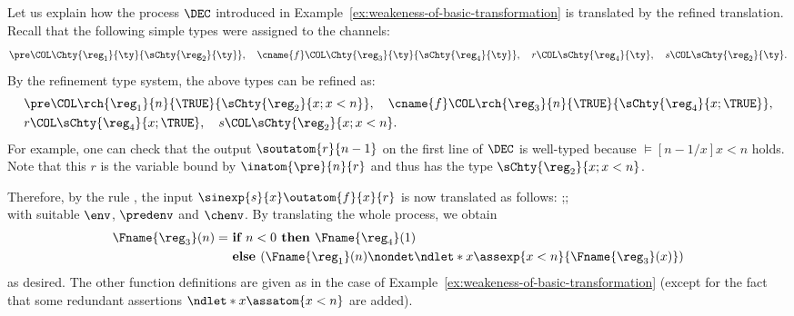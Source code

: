 \begin{example}  \label{ex:refined-transformation-for-f}
Let us explain how the process \( \DEC \) introduced in Example~\ref{ex:weakeness-of-basic-transformation} is translated by the refined translation.
Recall that the following simple types were assigned to the channels:
\begin{align*}
    \pre\COL \Chty{\reg_1}{\ty}{\sChty{\reg_2}{\ty}}, \quad
    \cname{f} \COL \Chty{\reg_3}{\ty}{\sChty{\reg_4}{\ty}}, \quad
    r \COL \sChty{\reg_4}{\ty}, \quad
    s \COL \sChty{\reg_2}{\ty}.
\end{align*}
By the refinement type system, the above types can be refined as:
\begin{align*}
    &\pre\COL \rch{\reg_1}{n}{\TRUE}{\sChty{\reg_2}{x; x < n}}, \quad
    \cname{f} \COL \rch{\reg_3}{n}{\TRUE}{\sChty{\reg_4}{x; \TRUE}}, \\
    &r \COL \sChty{\reg_4}{x; \TRUE}, \quad
    s \COL \sChty{\reg_2}{x; x < n}.
\end{align*}
For example, one can check that the output \( \soutatom{r}{n - 1} \) on the first line of \( \DEC \) is well-typed because \( \models [n - 1/x]x < n \) holds.
Note that this \( r \) is the variable bound by \( \inatom{\pre}{n}{r} \) and thus has the type \( \sChty{\reg_2}{x; x < n} \).

Therefore, by the rule , the input \( \sinexp{s}{x}\outatom{f}{x}{r} \) is now translated as follows:
{\env;\predenv;\chenv \vdash {} \hspace{7cm}
          \qquad \\
          \Rightarrow
          }
with suitable \( \env \), \( \predenv \) and \( \chenv \).
By translating the whole process, we obtain
\begin{align*}
\Fname{\reg_3}(n) = \ &\textbf{if }{n<0} \textbf{ then } \Fname{\reg_4}(1) \\
    &\textbf{else }(\Fname{\reg_1}(n) \nondet \ndlet*{x}{\assexp{x < n}{\Fname{\reg_3}(x)}})
\end{align*}
as desired.
The other function definitions are given as in the case of Example~\ref{ex:weakeness-of-basic-transformation} (except for the fact that some redundant assertions \( \ndlet*{x}{\assatom{x < n}} \) are added).
\end{example}

